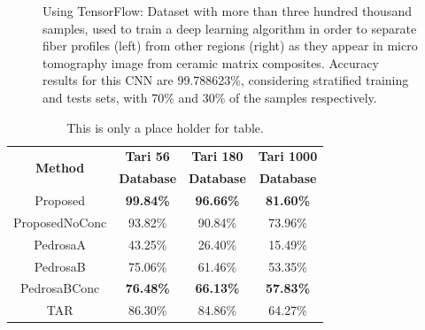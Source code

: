 \begin{figure}[!t]
\centering
{}
\hfil
{}
\caption{Using TensorFlow: Dataset with more than three hundred thousand samples, used to train a deep
learning algorithm in order to separate fiber profiles (left) from other regions (right) as they
appear in micro tomography image from ceramic matrix composites. Accuracy results for this CNN are
99.788623\%, considering stratified training and tests sets, with 70\% and 30\% of the samples
respectively.}
\label{fig:pycbir}
\end{figure}



\begin{table}[!h]
\caption{This is only a place holder for table.}\label{tab:accTari} \centering
\begin{tabular}{|c||c|c|c|}
  \hline
  \multirow{2}{*}{\textbf{Method}} & \textbf{Tari 56} & \textbf{Tari 180} & \textbf{Tari 1000} \\
   & \textbf{Database} & \textbf{Database} & \textbf{Database} \\
  \hline
  Proposed & \textbf{99.84\%} & \textbf{96.66\%} & \textbf{81.60\%} \\
  \hline
  ProposedNoConc & 93.82\% & 90.84\% & 73.96\% \\
  \hline
  PedrosaA \cite{Pedrosa:2011a} & 43.25\% & 26.40\% & 15.49\% \\
  \hline
  PedrosaB \cite{Pedrosa:2011b} & 75.06\% & 61.46\% & 53.35\% \\
  \hline
  PedrosaBConc & \textbf{76.48\%} & \textbf{66.13\%} & \textbf{57.83\%} \\
  \hline
  TAR & 86.30\% & 84.86\% & 64.27\% \\
  \hline
\end{tabular}
\end{table}
